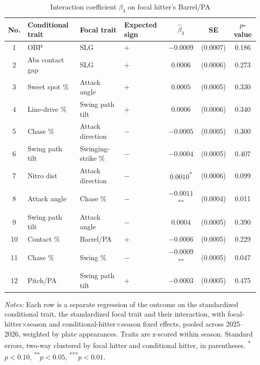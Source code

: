 \begin{table}[htbp]
\centering
\small
\caption{Interaction coefficient $\beta_3$ on focal hitter's Barrel/PA}
\label{tab:table1_barrel_pooled}
\begin{tabular}{clllccc}
\toprule
No. & Conditional trait & Focal trait & Expected sign & $\hat\beta_3$ & SE & $p$-value \\
\midrule
1 & OBP & SLG & $+$ & $-0.0009$ & (0.0007) & 0.186 \\
2 & Abs contact gap & SLG & $+$ & $0.0006$ & (0.0006) & 0.273 \\
3 & Sweet spot \% & Attack angle & $+$ & $0.0005$ & (0.0005) & 0.330 \\
4 & Line-drive \% & Swing path tilt & $+$ & $0.0006$ & (0.0006) & 0.340 \\
5 & Chase \% & Attack direction & $-$ & $-0.0005$ & (0.0005) & 0.300 \\
6 & Swing path tilt & Swinging-strike \% & $-$ & $-0.0004$ & (0.0005) & 0.407 \\
7 & Nitro dist & Attack direction & $-$ & $0.0010$\textsuperscript{*} & (0.0006) & 0.099 \\
8 & Attack angle & Chase \% & $-$ & $-0.0011$\textsuperscript{**} & (0.0004) & 0.011 \\
9 & Swing path tilt & Attack angle & $-$ & $0.0004$ & (0.0005) & 0.390 \\
10 & Contact \% & Barrel/PA & $+$ & $-0.0006$ & (0.0005) & 0.229 \\
11 & Chase \% & Swing \% & $-$ & $-0.0009$\textsuperscript{**} & (0.0005) & 0.047 \\
12 & Pitch/PA & Swing path tilt & $+$ & $-0.0003$ & (0.0005) & 0.475 \\
\bottomrule
\end{tabular}
\par\smallskip\parbox{0.95\textwidth}{\footnotesize \textit{Notes:} Each row is a separate regression of the outcome on the standardized conditional trait, the standardized focal trait and their interaction, with focal-hitter$\times$season and conditional-hitter$\times$season fixed effects, pooled across 2025--2026, weighted by plate appearances. Traits are z-scored within season. Standard errors, two-way clustered by focal hitter and conditional hitter, in parentheses. \textsuperscript{*}$p<0.10$, \textsuperscript{**}$p<0.05$, \textsuperscript{***}$p<0.01$.}
\end{table}
